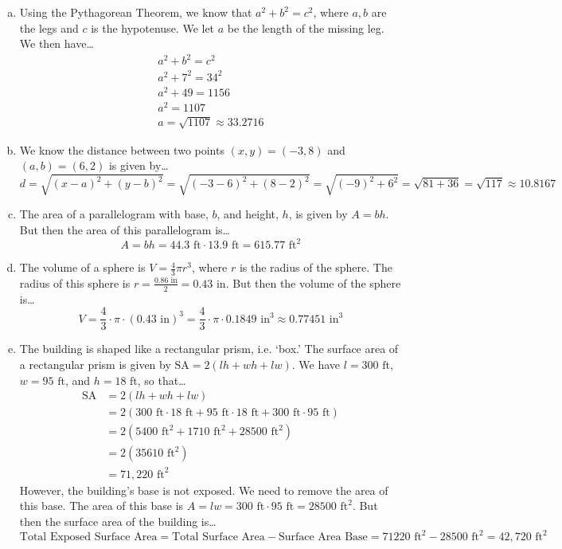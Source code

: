 \documentclass[11pt,letterpaper]{article}
\begin{document}
{ \small
\sol 
\begin{enumerate}[(a)]
\item Using the Pythagorean Theorem, we know that $a^2 + b^2= c^2$, where $a, b$ are the legs and $c$ is the hypotenuse. We let $a$ be the length of the missing leg. We then have\dots
	\[
	\begin{gathered}
	a^2 + b^2= c^2 \\
	a^2 + 7^2= 34^2 \\
	a^2 + 49= 1156 \\
	a^2= 1107 \\
	a= \sqrt{1107} \approx 33.2716
	\end{gathered}
	\]

\item We know the distance between two points $(x, y)= (-3, 8)$ and $(a, b)= (6, 2)$ is given by\dots
	\[
	d= \sqrt{(x - a)^2 + (y - b)^2}= \sqrt{(-3 - 6)^2 + (8 - 2)^2}= \sqrt{(-9)^2 + 6^2}= \sqrt{81 + 36}= \sqrt{117} \approx 10.8167
	\] 

\item The area of a parallelogram with base, $b$, and height, $h$, is given by $A= bh$. But then the area of this parallelogram is\dots
	\[
	A= bh= 44.3 \text{ ft} \cdot 13.9 \text{ ft}= 615.77 \text{ ft}^2
	\]

\item The volume of a sphere is $V= \frac{4}{3} \pi r^3$, where $r$ is the radius of the sphere. The radius of this sphere is $r= \frac{0.86 \text{ in}}{2}= 0.43 \text{ in}$. But then the volume of the sphere is\dots
	\[
	V= \frac{4}{3} \cdot \pi \cdot (0.43 \text{ in})^3= \frac{4}{3} \cdot \pi \cdot 0.1849 \text{ in}^3 \approx 0.77451 \text{ in}^3
	\]

\item The building is shaped like a rectangular prism, i.e. `box.' The surface area of a rectangular prism is given by $\text{SA}= 2(lh + wh + lw)$. We have $l = 300 \text{ ft}$, $w= 95 \text{ ft}$, and $h= 18 \text{ ft}$, so that\dots
	\[
	\begin{aligned}
	\text{SA}&= 2(lh + wh + lw) \\
	&= 2 (300 \text{ ft} \cdot 18 \text{ ft} + 95 \text{ ft} \cdot 18 \text{ ft} + 300 \text{ ft} \cdot 95 \text{ ft} ) \\
	&= 2 (5400 \text{ ft}^2 + 1710 \text{ ft}^2 + 28500 \text{ ft}^2) \\
	&= 2(35610 \text{ ft}^2) \\
	&= 71,\!220 \text{ ft}^2
	\end{aligned}
	\]
However, the building's base is not exposed. We need to remove the area of this base. The area of this base is $A= lw= 300 \text{ ft} \cdot 95 \text{ ft}= 28500 \text{ ft}^2$. But then the surface area of the building is\dots
	\[
	\text{Total Exposed Surface Area}= \text{Total Surface Area} - \text{Surface Area Base}= 71220 \text{ ft}^2 - 28500 \text{ ft}^2= 42,\!720 \text{ ft}^2
	\]
\end{enumerate}
}
\end{document}
